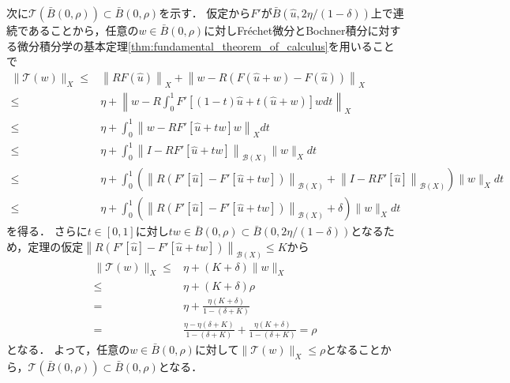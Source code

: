 \begin{Proof}
	次に${\mathcal T}( \bar{B}(0, \rho) ) \subset \bar{B}(0, \rho)$を示す．
	仮定から$F'$が$\bar{B}(\hat{u}, 2\eta/(1-\delta))$上で連続であることから，任意の$w \in \bar{B}(0, \rho)$に対しFr\'echet微分とBochner積分に対する微分積分学の基本定理\ref{thm:fundamental_theorem_of_calculus}を用いることで
	\begin{align*}
		\| {\mathcal T}(w) \|_{X} \le& \left\| R F(\hat{u}) \right\|_{X} + \left\| w - R \left(  F(\hat{u} + w) - F(\hat{u})  \right) \right\|_{X} \\
		\le& \eta + \left\| w - R \int_0^1 F'[(1-t) \hat{u} + t (\hat{u} + w) ] w dt \right\|_{X} \\
		\le& \eta + \int_0^1 \left\| w - R F'[\hat{u} + t w ] w \right\|_{X} dt \\
		\le& \eta + \int_0^1 \left\| I - R F'[\hat{u} + t w ]  \right\|_{{\mathcal B}(X)} \| w \|_{X} dt\\
		\le& \eta + \int_0^1 \left( \left\| R (  F'[\hat{u}] -  F'[\hat{u} + t w ])  \right\|_{{\mathcal B}(X)} +  \left\| I - R F'[\hat{u} ]  \right\|_{{\mathcal B}(X)} \right) \| w \|_{X} dt\\
		\le& \eta + \int_0^1 \left( \left\| R (  F'[\hat{u}] -  F'[\hat{u} + t w ])  \right\|_{{\mathcal B}(X)} +  \delta \right) \| w \|_{X} dt
	\end{align*}
	を得る．
	さらに$t \in [0, 1]$に対し$tw \in \bar{B}(0, \rho) \subset \bar{B}(0, 2\eta/(1 - \delta))$となるため，定理の仮定$\left\| R (  F'[\hat{u}] -  F'[\hat{u} + t w ])  \right\|_{{\mathcal B}(X)} \le K$から
	\begin{align*}
		\| {\mathcal T}(w) \|_{X} \le& \eta + \left( K + \delta  \right) \| w \|_{X} \\
		\le& \eta + \left( K + \delta  \right) \rho \\
		=& \eta + \frac{ \eta \left( K + \delta  \right) }{ 1 - ( \delta + K ) } \\
		=& \frac{ \eta - \eta (\delta + K) }{ 1 - ( \delta + K ) } + \frac{ \eta \left( K + \delta  \right) }{ 1 - ( \delta + K ) } = \rho
	\end{align*}
	となる．
	よって，任意の$w \in \bar{B}(0, \rho)$に対して$\| {\mathcal T}(w) \|_{X} \le \rho$となることから，${\mathcal T}( \bar{B}(0, \rho) ) \subset \bar{B}(0, \rho)$となる．
		

\end{Proof}
